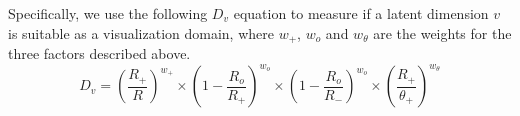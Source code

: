 \documentclass{vgtc}                          %
\begin{document}
Specifically, we use the following $D_v$ equation to measure if a latent dimension $v$ is suitable as a visualization domain, where $w_+$, $w_{o}$ and $w_{\theta}$ are the weights for the three factors described above.
\begin{equation}
D_v =  (\frac{R_+}{R})^{w_+} \times (1 - \frac{R_o}{R_+})^{w_o}  \times (1 - \frac{R_o}{R_-})^{w_o} \times ( \frac{R_+}{\theta_+})^{w_{\theta}} 
\label{equ:dv}
\end{equation}


\end{document}
